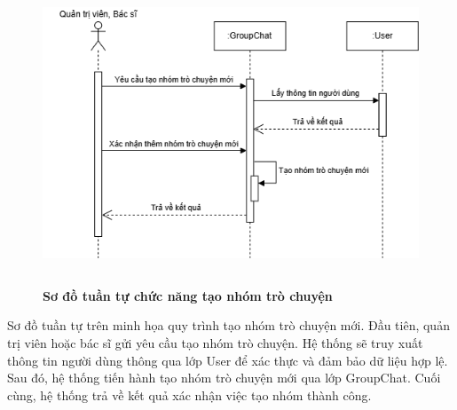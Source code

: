 \begin{figure}[H]
	\centering
	\includegraphics[width=12.5cm,height=9cm]{Images/sequence/chat/createGroupChat.drawio.png}
	\caption[Sơ đồ tuần tự chức năng tạo nhóm trò chuyện]{\bfseries \fontsize{12pt}{0pt}
		\selectfont Sơ đồ tuần tự chức năng tạo nhóm trò chuyện}
	\label{sequence_create} %
\end{figure}
Sơ đồ tuần tự trên minh họa quy trình tạo nhóm trò chuyện mới. Đầu tiên, quản trị viên hoặc bác sĩ gửi yêu cầu tạo nhóm trò chuyện.
Hệ thống sẽ truy xuất thông tin người dùng thông qua lớp User để xác thực và đảm bảo dữ liệu hợp lệ.
Sau đó, hệ thống tiến hành tạo nhóm trò chuyện mới qua lớp GroupChat. Cuối cùng, hệ thống trả về kết quả xác nhận việc tạo nhóm thành công.

